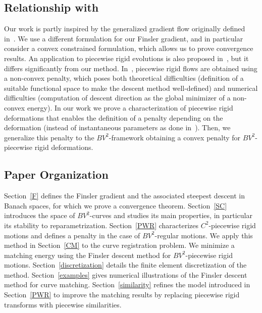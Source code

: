 \subsection{Relationship with~\cite{charpiat-generalized-gradient}}
\label{sec-relation-charpiat}

Our work is partly inspired by the generalized gradient flow originally defined in~\cite{charpiat-generalized-gradient}. We use a different formulation for our Finsler gradient, and in particular consider a convex constrained formulation, which allows us to prove convergence results. An application to piecewise rigid evolutions is also proposed in~\cite{charpiat-generalized-gradient}, but it differs significantly from our method. In~\cite{charpiat-generalized-gradient}, piecewise rigid flows are obtained using a non-convex penalty, which poses both theoretical difficulties (definition of a suitable functional space to make the descent method well-defined) and numerical difficulties (computation of descent direction as the global minimizer of a non-convex energy). In our work  we prove a characterization of piecewise rigid deformations that enables the definition of a penalty  depending on the deformation (instead of instantaneous parameters as done in~\cite{charpiat-generalized-gradient}). Then, we generalize this penalty to the $BV^2$-framework obtaining a convex penalty for $BV^2$-piecewise rigid deformations. 


\subsection{Paper Organization}

Section~\ref{F} defines the Finsler gradient and the associated steepest descent in Banach spaces, for which we prove a convergence theorem. Section~\ref{SC} introduces the space of $BV^2$-curves and studies its main properties, in particular its stability to reparametrization.
Section~\ref{PWR} characterizes $C^2$-piecewise rigid motions and defines a penalty in the case of  $BV^2$-regular motions. We apply this method in Section~\ref{CM} to the curve registration problem. We minimize a matching energy using the Finsler descent method for $BV^2$-piecewise rigid motions. Section~\ref{discretization} details the finite element discretization of the method. Section~\ref{examples} gives numerical illustrations of the Finsler descent method for curve matching. Section~\ref{similarity} refines the model introduced in Section~\ref{PWR} to improve the matching results by replacing piecewise rigid transforms with piecewise similarities.
